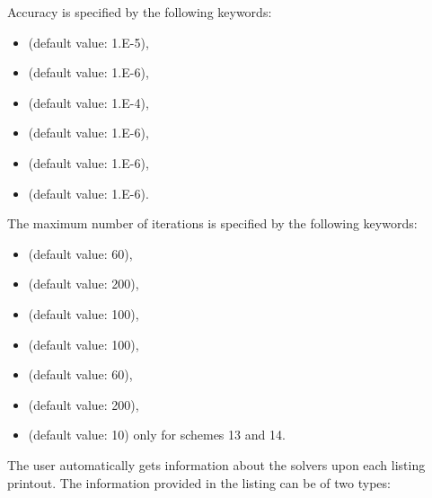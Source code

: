 Accuracy is specified by the following keywords:

\begin{itemize}
\item {} (default value: 1.E-5),

\item {} (default value: 1.E-6),

\item {} (default value: 1.E-4),

\item {} (default value: 1.E-6),

\item {} (default value: 1.E-6),

\item {} (default value: 1.E-6).
\end{itemize}

The maximum number of iterations is specified by the following keywords:

\begin{itemize}
\item {}(default value: 60),

\item {} (default value:
200),

\item {} (default value: 100),

\item {} (default
value: 100),

\item {}(default
value: 60),

\item {}(default
value: 200),

\item {}(default
value: 10) only for schemes 13 and 14.
\end{itemize}

The user automatically gets information about the solvers upon each listing
printout. The information provided in the listing can be of two types:

